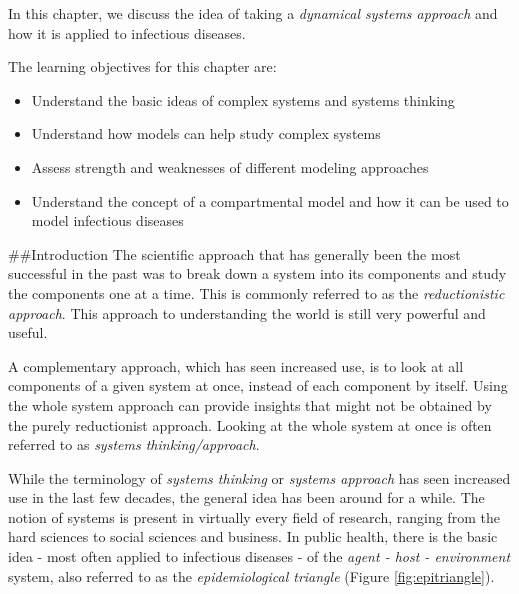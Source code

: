 \documentclass[]{book}
\providecommand{\tightlist}{%
  \setlength{\itemsep}{0pt}\setlength{\parskip}{0pt}}
\theoremstyle{definition}
\theoremstyle{definition}
\theoremstyle{definition}
\theoremstyle{remark}
\begin{document}
In this chapter, we discuss the idea of taking a \emph{dynamical systems
approach} and how it is applied to infectious diseases.

The learning objectives for this chapter are:

\begin{itemize}
\tightlist
\item
  Understand the basic ideas of complex systems and systems thinking
\item
  Understand how models can help study complex systems
\item
  Assess strength and weaknesses of different modeling approaches
\item
  Understand the concept of a compartmental model and how it can be used
  to model infectious diseases
\end{itemize}

\#\#Introduction The scientific approach that has generally been the
most successful in the past was to break down a system into its
components and study the components one at a time. This is commonly
referred to as the \emph{reductionistic approach}. This approach to
understanding the world is still very powerful and useful.

A complementary approach, which has seen increased use, is to look at
all components of a given system at once, instead of each component by
itself. Using the whole system approach can provide insights that might
not be obtained by the purely reductionist approach. Looking at the
whole system at once is often referred to as \emph{systems
thinking/approach}.

While the terminology of \emph{systems thinking} or \emph{systems
approach} has seen increased use in the last few decades, the general
idea has been around for a while. The notion of systems is present in
virtually every field of research, ranging from the hard sciences to
social sciences and business. In public health, there is the basic idea
- most often applied to infectious diseases - of the \emph{agent - host
- environment} system, also referred to as the \emph{epidemiological
triangle} (Figure \ref{fig:epitriangle}).
\end{document}
